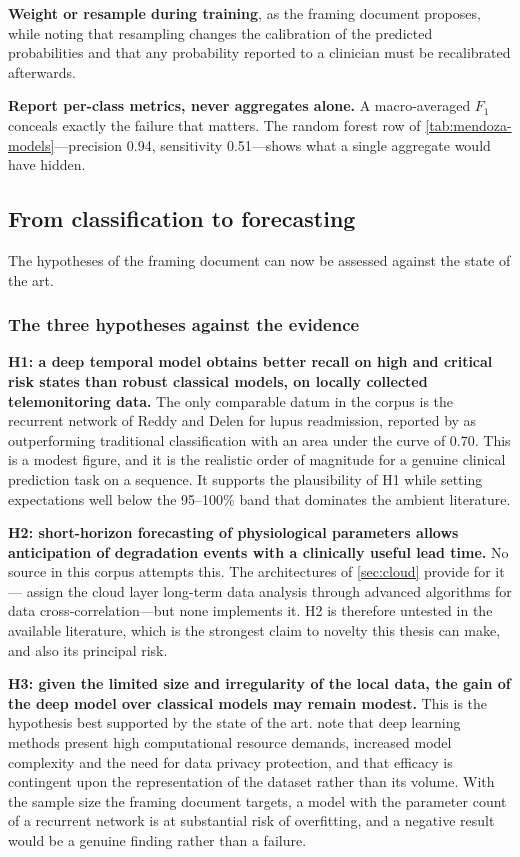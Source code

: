 \documentclass[12pt,a4paper,oneside]{report}
\begin{document}
\textbf{Weight or resample during training}, as the framing document proposes, while noting that resampling changes the calibration of the predicted probabilities and that any probability reported to a clinician must be recalibrated afterwards.

\textbf{Report per-class metrics, never aggregates alone.} A macro-averaged $F_1$ conceals exactly the failure that matters. The random forest row of \cref{tab:mendoza-models}---precision 0.94, sensitivity 0.51---shows what a single aggregate would have hidden.

\subsection{From classification to forecasting}\label{sec:forecasting}

The hypotheses of the framing document can now be assessed against the state of the art.

\subsubsection{The three hypotheses against the evidence}

\textbf{H1: a deep temporal model obtains better recall on high and critical risk states than robust classical models, on locally collected telemonitoring data.} The only comparable datum in the corpus is the recurrent network of Reddy and Delen for lupus readmission, reported by \textcite{liu2025review} as outperforming traditional classification with an area under the curve of 0.70. This is a modest figure, and it is the realistic order of magnitude for a genuine clinical prediction task on a sequence. It supports the plausibility of H1 while setting expectations well below the 95--100\% band that dominates the ambient literature.

\textbf{H2: short-horizon forecasting of physiological parameters allows anticipation of degradation events with a clinically useful lead time.} No source in this corpus attempts this. The architectures of \cref{sec:cloud} provide for it---\textcite{mucchi2021} assign the cloud layer long-term data analysis through advanced algorithms for data cross-correlation---but none implements it. H2 is therefore untested in the available literature, which is the strongest claim to novelty this thesis can make, and also its principal risk.

\textbf{H3: given the limited size and irregularity of the local data, the gain of the deep model over classical models may remain modest.} This is the hypothesis best supported by the state of the art. \Textcite{liu2025review} note that deep learning methods present high computational resource demands, increased model complexity and the need for data privacy protection, and that efficacy is contingent upon the representation of the dataset rather than its volume. With the sample size the framing document targets, a model with the parameter count of a recurrent network is at substantial risk of overfitting, and a negative result would be a genuine finding rather than a failure.
\end{document}
